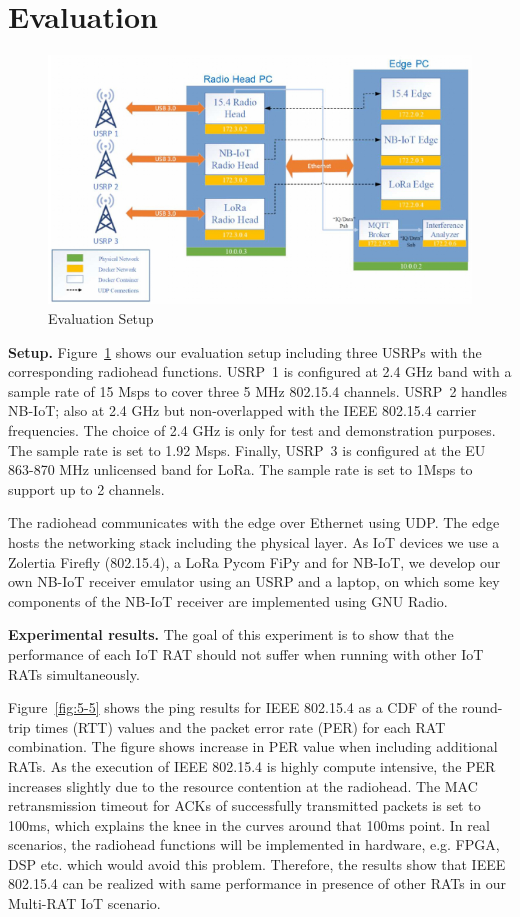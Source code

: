 \documentclass[10pt,emptycopyrightspace]{ewsn-proc}
\newcommand{\fakepar}[1]{\noindent\textbf{#1.}}
\begin{document}

\section{Evaluation}

\begin{figure}[t]
  \centering
	\includegraphics[width= 0.40 \textwidth]{setup-alt.jpg}
	\caption{Evaluation Setup}
	\label{fig:setup}
  \vspace{-0.5cm}
\end{figure}

\fakepar{Setup} Figure~\ref{fig:setup} shows our evaluation setup including
three USRPs with the corresponding radiohead functions. USRP~1 is configured at 2.4 GHz
band with a sample rate of 15 Msps to cover three 5 MHz 802.15.4 channels.
USRP~2 handles NB-IoT;
also at 2.4 GHz but non-overlapped with the IEEE 802.15.4
carrier frequencies. The choice of 2.4 GHz is only for test and demonstration
purposes. The sample
rate is set to 1.92 Msps. Finally, USRP~3 is
configured at the EU 863-870 MHz unlicensed band for LoRa. The sample
rate is set to 1Msps to support up to 2 channels.

The radiohead communicates with the edge over Ethernet using UDP. The edge hosts the networking stack including the physical layer. As IoT devices we use a Zolertia Firefly (802.15.4), a LoRa  Pycom FiPy and for NB-IoT, we develop our own NB-IoT receiver emulator using an USRP and a laptop, on which some key components of the NB-IoT receiver are implemented using GNU Radio.

\fakepar{Experimental results}
The goal of this experiment is to show that the
performance of each IoT RAT should not suffer when running with other IoT RATs simultaneously.

Figure~\ref{fig:5-5} shows the ping results for IEEE 802.15.4 as a CDF of
the round-trip times (RTT) values and the packet error rate (PER) for
each RAT combination.  The figure shows increase in PER value when
including additional RATs.  As the execution of IEEE 802.15.4 is
highly compute intensive, the PER increases
slightly due to the resource contention at the radiohead. The MAC retransmission timeout for ACKs of
successfully transmitted packets is set to 100ms, which explains the
knee in the curves around that 100ms point.
In real scenarios, the radiohead functions will be implemented in
hardware, e.g. FPGA, DSP etc. which would avoid this
problem. Therefore, the results show that IEEE 802.15.4 can be
realized with same performance in presence of other RATs in our
Multi-RAT IoT scenario.
\end{document}
